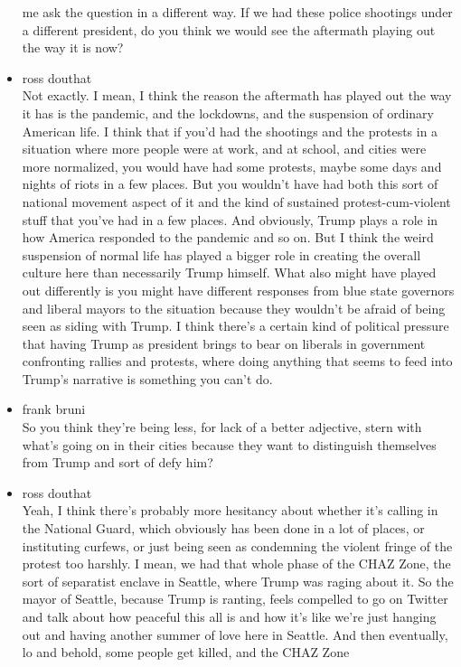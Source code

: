 \begin{itemize}
  me ask the question in a different way. If we had these police
  shootings under a different president, do you think we would see the
  aftermath playing out the way it is now?
\item
  ross douthat\\
  Not exactly. I mean, I think the reason the aftermath has played out
  the way it has is the pandemic, and the lockdowns, and the suspension
  of ordinary American life. I think that if you'd had the shootings and
  the protests in a situation where more people were at work, and at
  school, and cities were more normalized, you would have had some
  protests, maybe some days and nights of riots in a few places. But you
  wouldn't have had both this sort of national movement aspect of it and
  the kind of sustained protest-cum-violent stuff that you've had in a
  few places. And obviously, Trump plays a role in how America responded
  to the pandemic and so on. But I think the weird suspension of normal
  life has played a bigger role in creating the overall culture here
  than necessarily Trump himself. What also might have played out
  differently is you might have different responses from blue state
  governors and liberal mayors to the situation because they wouldn't be
  afraid of being seen as siding with Trump. I think there's a certain
  kind of political pressure that having Trump as president brings to
  bear on liberals in government confronting rallies and protests, where
  doing anything that seems to feed into Trump's narrative is something
  you can't do.
\item
  frank bruni\\
  So you think they're being less, for lack of a better adjective, stern
  with what's going on in their cities because they want to distinguish
  themselves from Trump and sort of defy him?
\item
  ross douthat\\
  Yeah, I think there's probably more hesitancy about whether it's
  calling in the National Guard, which obviously has been done in a lot
  of places, or instituting curfews, or just being seen as condemning
  the violent fringe of the protest too harshly. I mean, we had that
  whole phase of the CHAZ Zone, the sort of separatist enclave in
  Seattle, where Trump was raging about it. So the mayor of Seattle,
  because Trump is ranting, feels compelled to go on Twitter and talk
  about how peaceful this all is and how it's like we're just hanging
  out and having another summer of love here in Seattle. And then
  eventually, lo and behold, some people get killed, and the CHAZ Zone

\end{itemize}
